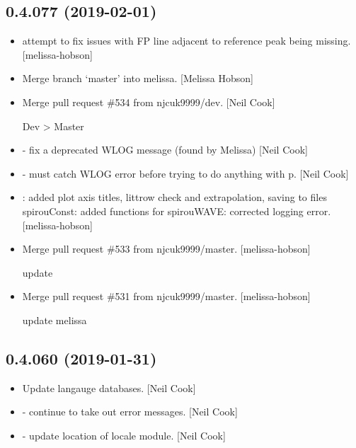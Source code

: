 \documentclass[a4paper,10pt,english]{report}
\begin{document}
\subsection{0.4.077 (2019-02-01)}
\label{\detokenize{misc/changelog:id199}}\begin{itemize}
\item {} 
 attempt to fix issues with FP line adjacent to
reference peak being missing. {[}melissa-hobson{]}

\item {} 
Merge branch ‘master’ into melissa. {[}Melissa Hobson{]}

\item {} 
Merge pull request \#534 from njcuk9999/dev. {[}Neil Cook{]}

Dev \textendash{}\textgreater{} Master

\item {} 
 - fix a deprecated WLOG message (found by Melissa) {[}Neil
Cook{]}

\item {} 
 - must catch WLOG error before trying to do anything with
p. {[}Neil Cook{]}

\item {} 
: added plot axis titles, littrow check and
extrapolation, saving to files spirouConst: added functions for
 spirouWAVE: corrected logging error. {[}melissa-hobson{]}

\item {} 
Merge pull request \#533 from njcuk9999/master. {[}melissa-hobson{]}

update

\item {} 
Merge pull request \#531 from njcuk9999/master. {[}melissa-hobson{]}

update melissa

\end{itemize}


\subsection{0.4.060 (2019-01-31)}
\label{\detokenize{misc/changelog:id200}}\begin{itemize}
\item {} 
Update langauge databases. {[}Neil Cook{]}

\item {} 
 - continue to take out error messages. {[}Neil Cook{]}

\item {} 
 - update location of locale module. {[}Neil Cook{]}

\end{itemize}
\end{document}
